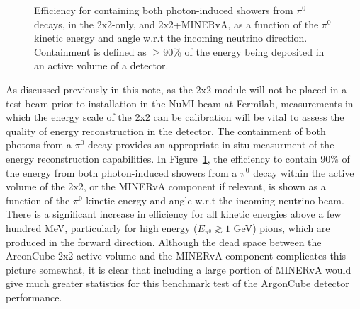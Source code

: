 \begin{figure}[htb]
  \centering
  \caption{Efficiency for containing both photon-induced showers from $\pi^{0}$ decays, in the 2x2-only, and 2x2+MINERvA, as a function of the $\pi^{0}$ kinetic energy and angle w.r.t the incoming neutrino direction. Containment is defined as $\geq$90\% of the energy being deposited in an active volume of a detector.}
  \label{fig:pi0_containment}
\end{figure}
As discussed previously in this note, as the 2x2 module will not be placed in a test beam prior to installation in the NuMI beam at Fermilab, measurements in which the energy scale of the 2x2 can be calibration will be vital to assess the quality of energy reconstruction in the detector. The containment of both photons from a $\pi^{0}$ decay provides an appropriate in situ measurment of the energy reconstruction capabilities. In Figure~\ref{fig:pi0_containment}, the efficiency to contain 90\% of the energy from both photon-induced showers from a $\pi^{0}$ decay within the active volume of the 2x2, or the MINERvA component if relevant, is shown as a function of the $\pi^{0}$ kinetic energy and angle w.r.t the incoming neutrino beam. There is a significant increase in efficiency for all kinetic energies above a few hundred MeV, particularly for high energy ($E_{\pi^{0}} \gtrsim 1$ GeV) pions, which are produced in the forward direction. Although the dead space between the ArconCube 2x2 active volume and the MINERvA component complicates this picture somewhat, it is clear that including a large portion of MINERvA would give much greater statistics for this benchmark test of the ArgonCube detector performance.

